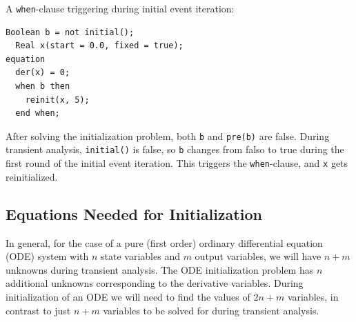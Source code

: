 \begin{example}
A \lstinline!when!-clause triggering during initial event iteration:
\begin{lstlisting}[language=modelica]
  Boolean b = not initial();
  Real x(start = 0.0, fixed = true);
equation
  der(x) = 0;
  when b then
    reinit(x, 5);
  end when;
\end{lstlisting}
After solving the initialization problem, both \lstinline!b! and \lstinline!pre(b)! are false.
During transient analysis, \lstinline!initial()! is false, so \lstinline!b! changes from falso to true during the first round of the initial event iteration.
This triggers the \lstinline!when!-clause, and \lstinline!x! gets reinitialized.
\end{example}


\subsection{Equations Needed for Initialization}\label{the-number-of-equations-needed-for-initialization}\label{equations-needed-for-initialization}

\begin{nonnormative}
In general, for the case of a pure (first order) ordinary differential equation (ODE) system with $n$ state variables and $m$ output variables, we will have $n+m$ unknowns during transient analysis.
The ODE initialization problem has $n$ additional unknowns corresponding to the derivative variables.
During initialization of an ODE we will need to find the values of $2n+m$ variables, in contrast to just $n+m$ variables to be solved for during transient analysis.
\end{nonnormative}

